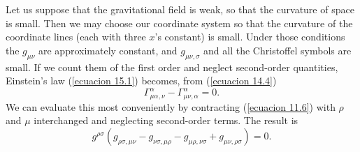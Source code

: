 Let us suppose that the gravitational field is weak, so that the curvature of space is small. Then we may choose our 
coordinate system so that the curvature of the coordinate lines (each with three $x$'s constant) is small. Under those 
conditions the $g_{\mu\nu}$ are approximately constant, and $g_{\mu\nu,\sigma}$ and all the Christoffel symbols are 
small. If we count them of the first order and neglect second-order quantities, Einstein's law (\ref{ecuacion 15.1}) 
becomes, from (\ref{ecuacion 14.4})
\[
 \Gamma^{\alpha}_{\mu\alpha,\nu} - \Gamma^{\alpha}_{\mu\nu,\alpha} = 0.
\]
We can evaluate this most conveniently by contracting (\ref{ecuacion 11.6}) with $\rho$ and $\mu$ interchanged and 
neglecting second-order terms. The result is
\begin{equation}
 \label{ecuacion 16.4}
 g^{\rho\sigma} \left( 
      g_{\rho\sigma,\mu\nu} 
    - g_{\nu\sigma,\mu\rho} 
    - g_{\mu\rho,\nu\sigma} 
    + g_{\mu\nu,\rho\sigma}  \right) = 0.
\end{equation}


